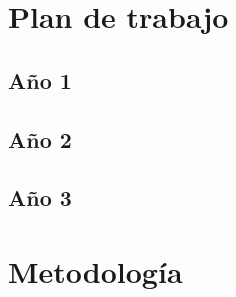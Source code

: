 \chapter{Plan de trabajo}
\label{ch:plan}

\section{Año 1}
\label{sec:y1}

\section{Año 2}
\label{sec:y2}

\section{Año 3}
\label{sec:y3}

\chapter{Metodología}
\label{ch:metodologia}







